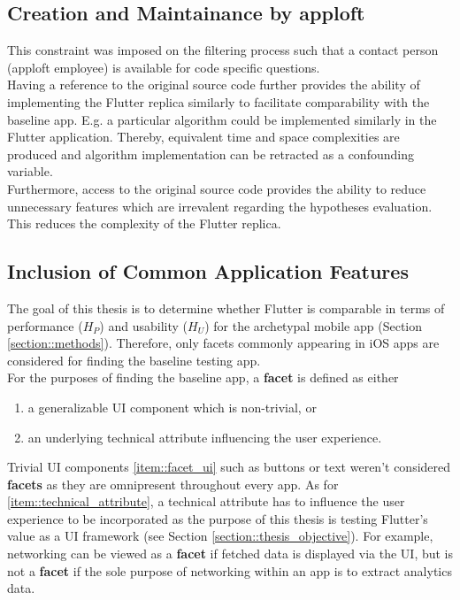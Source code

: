 \subsection*{Creation and Maintainance by apploft}
This constraint was imposed on the filtering process such that a contact person (apploft
employee) is available for code specific questions.\\
Having a reference to the original source code further provides the ability of implementing the Flutter replica similarly to facilitate comparability with the baseline app.
E.g. a particular algorithm could be implemented similarly in the Flutter application. Thereby, equivalent time and space complexities are produced and 
algorithm implementation can be retracted as a confounding variable.\\
Furthermore, access to the original source code provides the ability to reduce unnecessary features which are irrevalent regarding the hypotheses evaluation. This reduces the complexity of the Flutter replica.

\subsection*{Inclusion of Common Application Features}
The goal of this thesis is to determine whether Flutter is comparable in terms of performance ($H_P$) and usability ($H_U$) for the archetypal mobile app (Section \ref{section::methods}). 
Therefore, only facets commonly appearing in iOS apps are considered for finding the baseline testing app.\\
For the purposes of finding the baseline app, a \textbf{facet} is defined as either
\begin{enumerate}[label=(\alph*)]
    \item a generalizable UI component which is non-trivial, or \label{item::facet_ui}
    \item an underlying technical attribute influencing the user experience. \label{item::technical_attribute}
\end{enumerate}

Trivial UI components \ref{item::facet_ui} such as buttons or text weren't considered \textbf{facets} as they are omnipresent throughout every app.
As for \ref{item::technical_attribute}, a technical attribute has to influence the user experience to be incorporated as the purpose of this thesis is testing Flutter's value as a UI framework (see Section \ref{section::thesis_objective}).
For example, networking can be viewed as a \textbf{facet} if fetched data is displayed via the UI, but is not a \textbf{facet} if the sole purpose of networking within 
an app is to extract analytics data.


